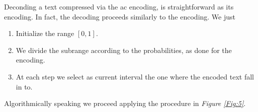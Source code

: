 \documentclass{subfiles}
\begin{document}
    Deconding a text compressed via the \gls{ac} encoding,
        is straightforward as its encoding.
        In fact, the decoding proceeds similarly to the encoding.
        We just 
        \begin{enumerate}
            \item Initialize the range \([0, 1]\).
            \item We divide the subrange according to the probabilities,
                as done for the encoding.
            \item At each step we select as current interval the one where the 
                encoded text fall in to.
        \end{enumerate}
        Algorithmically speaking we proceed applying the procedure in \emph{Figure \ref{Fig:5}}.
        
\end{document}
